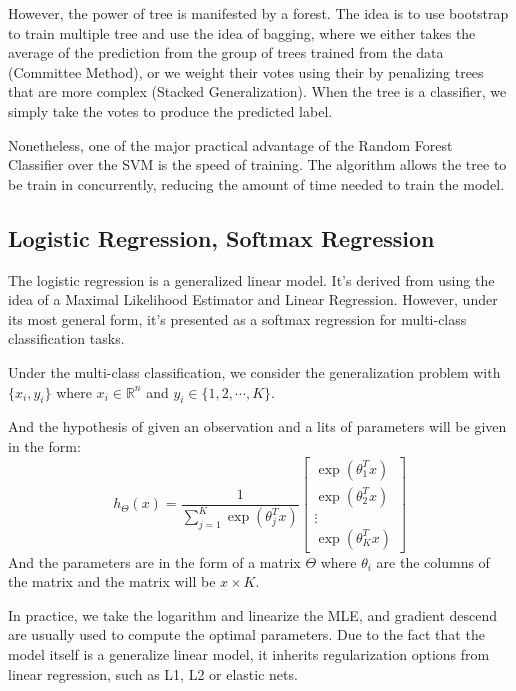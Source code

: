\documentclass{article}
\begin{document}
        \par
        However, the power of tree is manifested by a forest. The idea is to use bootstrap to train multiple tree and use the idea of bagging, where we either takes the average of the prediction from the group of trees trained from the data (Committee Method), or we weight their votes using their by penalizing trees that are more complex (Stacked Generalization). When the tree is a classifier, we simply take the votes to produce the predicted label. 
        \par
        Nonetheless, one of the major practical advantage of the Random Forest Classifier over the SVM is the speed of training. The algorithm allows the tree to be train in concurrently, reducing the amount of time needed to train the model. 
    \subsection*{Logistic Regression, Softmax Regression}
        \hspace{1.1em}
        The logistic regression is a generalized linear model. It's derived from using the idea of a Maximal Likelihood Estimator and Linear Regression. However, under its most general form, it's presented as a softmax regression for multi-class classification tasks. 
        \par
        Under the multi-class classification, we consider the generalization problem with $\{x_i, y_i\}$ where $x_i\in \mathbb{R}^n$ and $y_i \in \{1,2, \cdots , K\}$. 
        \par
        And the hypothesis of given an observation and a lits of parameters will be given in the form: 
        \begin{equation*}\tag{11}\label{eqn:11}
            h_\Theta(x) = 
            \frac{1}{\sum_{j = 1}^{K}\exp(\theta_j^Tx)}
            \begin{bmatrix}
                \exp(\theta_1^Tx) \\ 
                \exp(\theta_2^Tx) \\
                \vdots
                \\
                \exp(\theta_K^Tx)
            \end{bmatrix}
        \end{equation*}
        And the parameters are in the form of a matrix $\Theta$ where $\theta_i$ are the columns of the matrix and the matrix will be $x\times K$. 
        \par
        In practice, we take the logarithm and linearize the MLE, and gradient descend are usually used to compute the optimal parameters. Due to the fact that the model itself is a generalize linear model, it inherits regularization options from linear regression, such as L1, L2 or elastic nets. 
        
\end{document}
